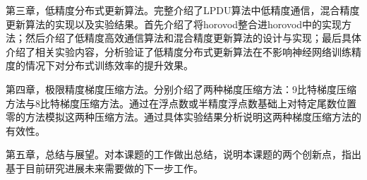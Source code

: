 第三章，低精度分布式更新算法。完整介绍了LPDU算法中低精度通信，混合精度更新算法的实现以及实验结果。首先介绍了将horovod整合进horovod中的实现方法；然后介绍了低精度高效通信算法和混合精度更新算法的设计与实现；最后具体介绍了相关实验内容，分析验证了低精度分布式更新算法在不影响神经网络训练精度的情况下对分布式训练效率的提升效果。

第四章，极限精度梯度压缩方法。分别介绍了两种梯度压缩方法：9比特梯度压缩方法与8比特梯度压缩方法。通过在浮点数或半精度浮点数基础上对特定尾数位置零的方法模拟这两种压缩方法。通过具体实验结果分析说明这两种梯度压缩方法的有效性。

第五章，总结与展望。对本课题的工作做出总结，说明本课题的两个创新点，指出基于目前研究进展未来需要做的下一步工作。
